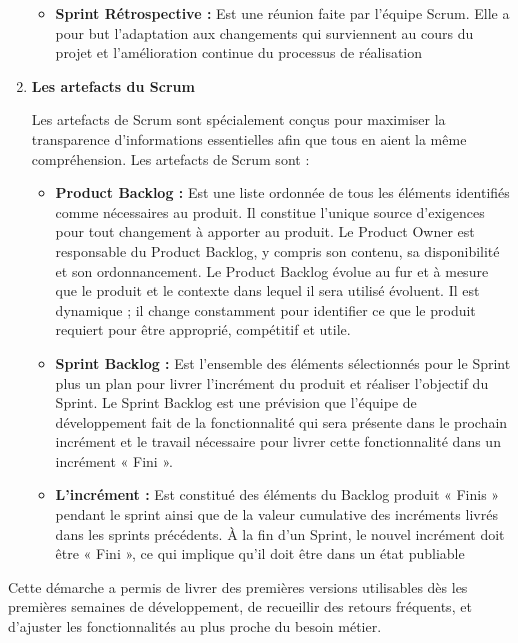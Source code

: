 \documentclass[11pt,a4paper]{article}
\begin{document}
\begin{enumerate}
\begin{itemize}
\item \textbf{Sprint Rétrospective :} Est une réunion faite par l’équipe Scrum. Elle a pour but l'adaptation aux changements qui surviennent au cours du projet et l'amélioration continue du processus de réalisation
\end{itemize}

\item \textbf{Les artefacts du Scrum }

Les artefacts de Scrum sont spécialement conçus pour maximiser la transparence d’informations essentielles afin que tous en aient la même compréhension. Les artefacts de Scrum sont :
\begin{itemize}


\item \textbf{Product Backlog :} Est une liste ordonnée de tous les éléments identifiés comme nécessaires au produit. Il constitue l’unique source d'exigences pour tout changement à apporter au produit. Le Product Owner est responsable du Product Backlog, y compris son contenu, sa disponibilité et son ordonnancement. Le Product Backlog évolue au fur et à mesure que le produit et le contexte dans lequel il sera utilisé évoluent. Il est dynamique ; il change constamment pour identifier ce que le produit requiert pour être approprié, compétitif et utile.

\item \textbf{Sprint Backlog :} Est l’ensemble des éléments sélectionnés pour le Sprint plus un plan pour livrer l’incrément du produit et réaliser l’objectif du Sprint. Le Sprint Backlog est une prévision que l’équipe de développement fait de la fonctionnalité qui sera présente dans le prochain incrément et le travail nécessaire pour livrer cette fonctionnalité dans un incrément « Fini ».

\item \textbf{L'incrément :} Est constitué des éléments du Backlog produit « Finis » pendant le sprint ainsi que de la valeur cumulative des incréments livrés dans les sprints précédents. À la fin d’un Sprint, le nouvel incrément doit être « Fini », ce qui implique qu’il doit être dans un état publiable
\end{itemize}
\end{enumerate}


Cette démarche a permis de livrer des premières versions utilisables dès les premières semaines de développement, de recueillir des retours fréquents, et d’ajuster les fonctionnalités au plus proche du besoin métier.
\end{document}

